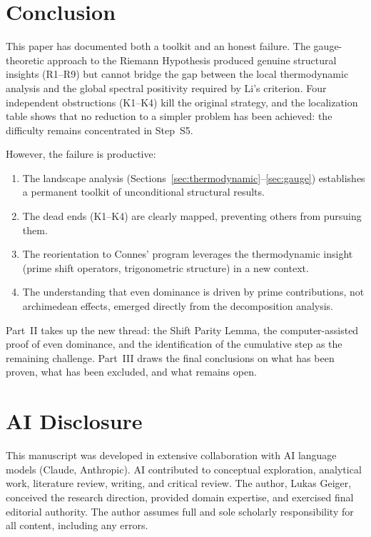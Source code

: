 \documentclass[12pt,a4paper]{article}
\theoremstyle{definition}
\theoremstyle{remark}
\begin{document}
\section{Conclusion}
\label{sec:conclusion}

This paper has documented both a toolkit and an honest failure. The gauge-theoretic approach to the Riemann Hypothesis produced genuine structural insights (R1--R9) but cannot bridge the gap between the local thermodynamic analysis and the global spectral positivity required by Li's criterion. Four independent obstructions (K1--K4) kill the original strategy, and the localization table shows that no reduction to a simpler problem has been achieved: the difficulty remains concentrated in Step~S5.

However, the failure is productive:
\begin{enumerate}
  \item The landscape analysis (Sections~\ref{sec:thermodynamic}--\ref{sec:gauge}) establishes a permanent toolkit of unconditional structural results.
  \item The dead ends (K1--K4) are clearly mapped, preventing others from pursuing them.
  \item The reorientation to Connes' program leverages the thermodynamic insight (prime shift operators, trigonometric structure) in a new context.
  \item The understanding that even dominance is driven by prime contributions, not archimedean effects, emerged directly from the decomposition analysis.
\end{enumerate}

Part~II takes up the new thread: the Shift Parity Lemma, the computer-assisted proof of even dominance, and the identification of the cumulative step as the remaining challenge. Part~III draws the final conclusions on what has been proven, what has been excluded, and what remains open.


\section*{AI Disclosure}

This manuscript was developed in extensive collaboration with AI language models (Claude, Anthropic). AI contributed to conceptual exploration, analytical work, literature review, writing, and critical review. The author, Lukas Geiger, conceived the research direction, provided domain expertise, and exercised final editorial authority. The author assumes full and sole scholarly responsibility for all content, including any errors.
\end{document}
